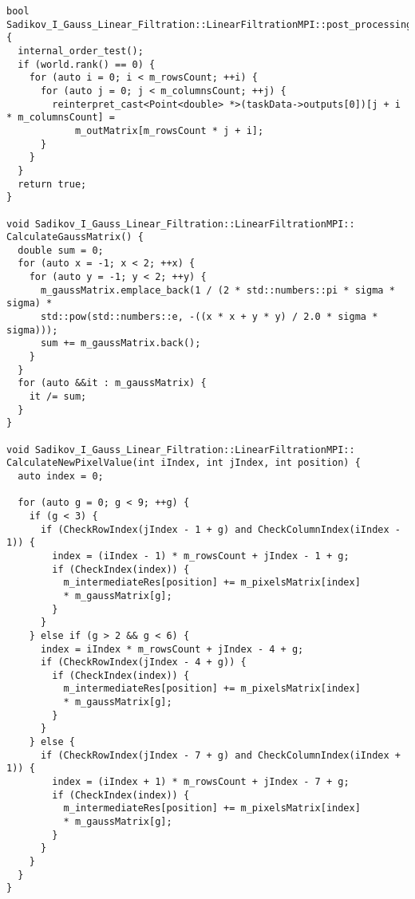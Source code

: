 \documentclass[14pt]{article}
\begin{document}
\begin{verbatim}
bool Sadikov_I_Gauss_Linear_Filtration::LinearFiltrationMPI::post_processing() {
  internal_order_test();
  if (world.rank() == 0) {
    for (auto i = 0; i < m_rowsCount; ++i) {
      for (auto j = 0; j < m_columnsCount; ++j) {
        reinterpret_cast<Point<double> *>(taskData->outputs[0])[j + i * m_columnsCount] =
            m_outMatrix[m_rowsCount * j + i];
      }
    }
  }
  return true;
}

void Sadikov_I_Gauss_Linear_Filtration::LinearFiltrationMPI::
CalculateGaussMatrix() {
  double sum = 0;
  for (auto x = -1; x < 2; ++x) {
    for (auto y = -1; y < 2; ++y) {
      m_gaussMatrix.emplace_back(1 / (2 * std::numbers::pi * sigma * sigma) *
      std::pow(std::numbers::e, -((x * x + y * y) / 2.0 * sigma * sigma)));
      sum += m_gaussMatrix.back();
    }
  }
  for (auto &&it : m_gaussMatrix) {
    it /= sum;
  }
}

void Sadikov_I_Gauss_Linear_Filtration::LinearFiltrationMPI::
CalculateNewPixelValue(int iIndex, int jIndex, int position) {
  auto index = 0;

  for (auto g = 0; g < 9; ++g) {
    if (g < 3) {
      if (CheckRowIndex(jIndex - 1 + g) and CheckColumnIndex(iIndex - 1)) {
        index = (iIndex - 1) * m_rowsCount + jIndex - 1 + g;
        if (CheckIndex(index)) {
          m_intermediateRes[position] += m_pixelsMatrix[index] 
          * m_gaussMatrix[g];
        }
      }
    } else if (g > 2 && g < 6) {
      index = iIndex * m_rowsCount + jIndex - 4 + g;
      if (CheckRowIndex(jIndex - 4 + g)) {
        if (CheckIndex(index)) {
          m_intermediateRes[position] += m_pixelsMatrix[index] 
          * m_gaussMatrix[g];
        }
      }
    } else {
      if (CheckRowIndex(jIndex - 7 + g) and CheckColumnIndex(iIndex + 1)) {
        index = (iIndex + 1) * m_rowsCount + jIndex - 7 + g;
        if (CheckIndex(index)) {
          m_intermediateRes[position] += m_pixelsMatrix[index]
          * m_gaussMatrix[g];
        }
      }
    }
  }
}
\end{verbatim}
\end{document}
